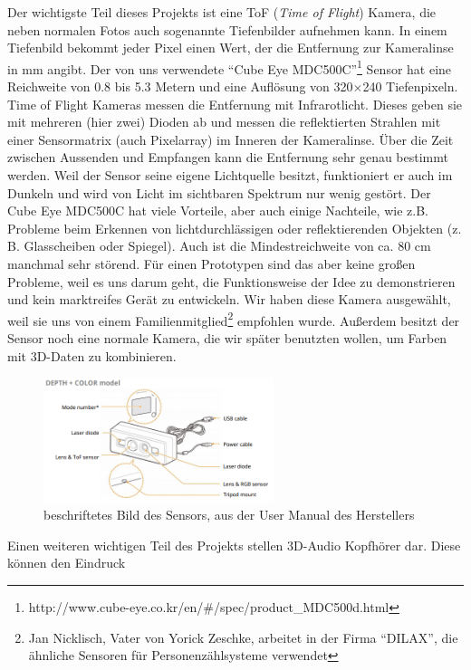 \documentclass[a4paper,12pt,ngerman]{scrartcl}
\begin{document}
Der wichtigste Teil dieses Projekts ist eine ToF (\textit{Time of Flight}) Kamera, die neben normalen Fotos 
auch sogenannte Tiefenbilder aufnehmen kann.
In einem Tiefenbild bekommt jeder Pixel einen Wert, der die Entfernung zur Kameralinse in mm angibt.
Der von uns verwendete \enquote{Cube Eye MDC500C}\footnote{http://www.cube-eye.co.kr/en/\#/spec/product\_MDC500d.html}
Sensor hat eine Reichweite von 0.8 bis 5.3 Metern und eine Auflösung von 320$\times$240 Tiefenpixeln. 
Time of Flight Kameras messen die Entfernung mit Infrarotlicht. Dieses geben sie mit mehreren (hier zwei) Dioden
ab und messen die reflektierten Strahlen mit einer Sensormatrix (auch Pixelarray) im Inneren der Kameralinse. 
Über die Zeit zwischen 
Aussenden und Empfangen kann die Entfernung sehr genau bestimmt werden.
Weil der Sensor seine eigene Lichtquelle besitzt, funktioniert er auch im Dunkeln und wird von Licht im 
sichtbaren Spektrum nur wenig gestört. Der Cube Eye MDC500C hat viele Vorteile, aber auch einige Nachteile, wie z.B. 
Probleme beim Erkennen von lichtdurchlässigen oder reflektierenden Objekten (z. B. Glasscheiben oder Spiegel). 
Auch ist die Mindestreichweite von ca. 80 cm manchmal sehr störend. Für einen Prototypen sind das aber keine großen
Probleme, weil es uns darum geht, die Funktionsweise der Idee zu demonstrieren und kein marktreifes
Gerät zu entwickeln. Wir haben diese Kamera ausgewählt, weil sie uns von einem 
Familienmitglied\footnote{Jan Nicklisch, Vater von Yorick Zeschke, arbeitet in der Firma
	\enquote{DILAX}, die ähnliche Sensoren für Personenzählsysteme verwendet} 
empfohlen wurde. Außerdem besitzt der Sensor noch eine normale Kamera, die wir später benutzten wollen, um Farben mit 
3D-Daten zu kombinieren.
\begin{figure}[H]
	\centering
	\includegraphics[width=0.6\textwidth]{cube_eye}
	\caption{beschriftetes Bild des Sensors, aus der User Manual des Herstellers}
	\label{cube_eye_sensor}
\end{figure} \par
Einen weiteren wichtigen Teil des Projekts stellen 3D-Audio Kopfhörer dar. Diese können den Eindruck
\end{document}
